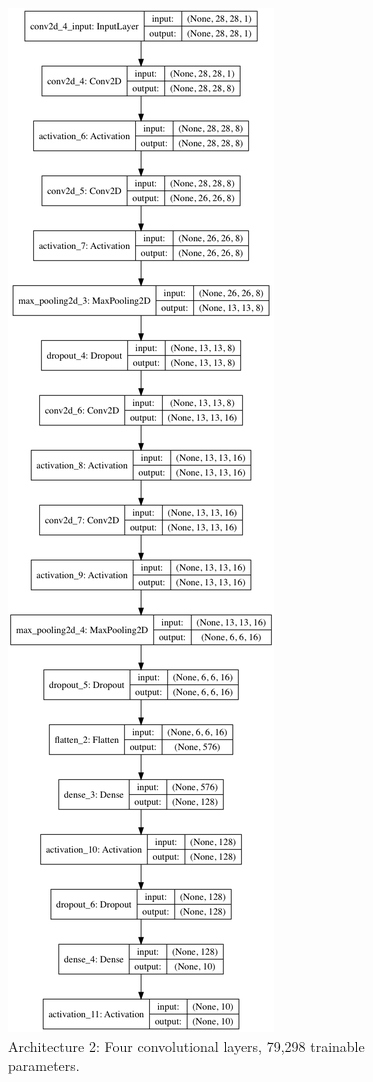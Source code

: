 \documentclass[letterpaper, 10 pt, conference]{ieeeconf}  %
\begin{document}
\begin{figure}
      \centering
      \includegraphics[scale = .3]{model1.png}
		\centering
      \caption{Architecture 2: Four convolutional layers, 79,298 trainable parameters.}
      \label{figurelabel}
   \end{figure}
   
\end{document}
